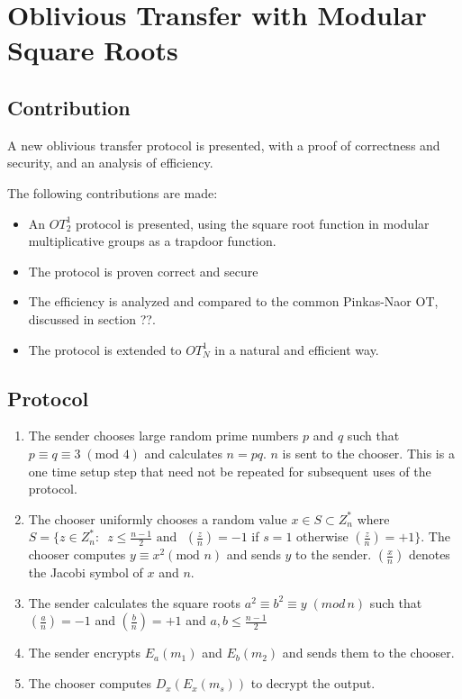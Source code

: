 \chapter{Oblivious Transfer with Modular Square Roots}\label{sec:OT-SquareRoots}
\label{chapter:otquad}


\section{Contribution}

A new oblivious transfer protocol is presented, with a proof of correctness
and security, and an analysis of efficiency. 

The following contributions are made:
\begin{itemize}
\item An $OT_{2}^{1}$ protocol is presented, using the square root function
in modular multiplicative groups as a trapdoor function.
\item The protocol is proven correct and secure
\item The efficiency is analyzed and compared to the common Pinkas-Naor
OT, discussed in section ??.
\item The protocol is extended to $OT_{N}^{1}$ in a natural and efficient
way.
\end{itemize}

\section{Protocol}
\begin{enumerate}
\item The sender chooses large random prime numbers $p$ and $q$ such that
$p\equiv q\equiv3\;(\mbox{mod }4)$ and calculates $n=pq$. $n$ is
sent to the chooser. This is a one time setup step that need not be
repeated for subsequent uses of the protocol. 
\item The chooser uniformly chooses a random value $x\in S\subset Z_{n}^{*}$
where $S=\{z\in Z_{n}^{*}:$~$z\le\frac{n-1}{2}\mbox{ and }$ $\left(\frac{z}{n}\right)=-1$
if $s=1$ otherwise $\left(\frac{z}{n}\right)=+1\}$. The chooser
computes $y\equiv x^{2}(\mbox{mod }n)$ and sends $y$ to the sender.
$\left(\frac{x}{n}\right)$ denotes the Jacobi symbol of $x$ and
$n$. 
\item The sender calculates the square roots $a^{2}\equiv b^{2}\equiv y\;(mod\, n)$
such that $\left(\frac{a}{n}\right)=-1$ and $\left(\frac{b}{n}\right)=+1$
and $a,b\le\frac{n-1}{2}$ 
\item The sender encrypts $E_{a}(m_{1})$ and $E_{b}(m_{2})$ and sends
them to the chooser. 
\item The chooser computes $D_{x}(E_{x}(m_{s}))$ to decrypt the output. 
\end{enumerate}

